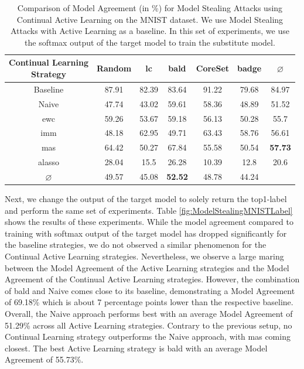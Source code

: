 \begin{table}[h]
    \centering
    \begin{tabular}{c | c c c c c | c } 
        \hline
        \diagbox[width=11em]{Active \\ Learning Strategy}{Continual Learning \\ Strategy} & Random & \gls{lc} & \gls{bald} & CoreSet & \gls{badge} & $\varnothing$\\ 
        \hline 
        Baseline & 87.91 & 82.39 & 83.64 & 91.22 & 79.68 & 84.97\\
        \hline
        Naive & 47.74 & 43.02 & 59.61 & 58.36 & 48.89 & 51.52\\
        \gls{ewc} &  59.26 & 53.67 & 59.18 & 56.13 & 50.28 & 55.7\\
        \gls{imm} & 48.18 & 62.95 & 49.71 & 63.43 & 58.76 & 56.61 \\
        \gls{mas} &  64.42 & 50.27 & 67.84 & 55.58 & 50.54 & \textbf{57.73}\\
        \gls{alasso} & 28.04 & 15.5 & 26.28 & 10.39 & 12.8 & 20.6\\
        \hline
        $\varnothing$ & 49.57 & 45.08 & \textbf{52.52} & 48.78 & 44.24 & \\
        \hline
    \end{tabular}
    \caption[Model agreement of Continual Learning strategies on MNIST using softmax output]{Comparison of Model Agreement (in \%) for Model Stealing Attacks using Continual Active Learning on the MNIST dataset. We use Model Stealing Attacks with Active Learning as a baseline.
    In this set of experiments, we use the softmax output of the target model to train the substitute model.}
    \label{fig:ModelStealingMNISTSoftmax}
\end{table}

Next, we change the output of the target model to solely return the top1-label and perform the same set of experiments. Table \ref{fig:ModelStealingMNISTLabel} shows the results of these experiments. While the model agreement compared to training with softmax output of the
target model has dropped significantly for the baseline strategies, we do not observed a similar phenomenon for the Continual Active Learning strategies. Nevertheless, we observe a large maring between the Model Agreement of the Active Learning strategies and the Model Agreement
of the Continual Active Learning strategies. However, the combination of \gls{bald} and Naive comes close to its baseline, demonstrating a Model Agreement of 69.18\% which is about 7 percentage points lower than the respective baseline. Overall, the Naive approach performs best with an
average Model Agreement of 51.29\% across all Active Learning strategies. Contrary to the previous setup, no Continual Learning strategy outperforms the Naive approach, with \gls{mas} coming closest. The best Active Learning strategy is \gls{bald} with an average Model Agreement of 55.73\%. \par 

